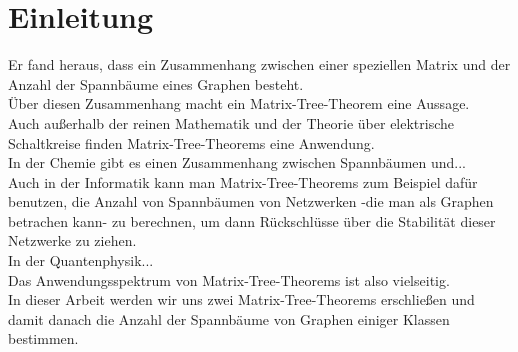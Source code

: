 \graphicspath{{grafiken/}}

\section{Einleitung}



Er fand heraus, dass ein Zusammenhang zwischen einer speziellen Matrix und der Anzahl der Spannbäume eines Graphen besteht. \\
Über diesen Zusammenhang macht ein Matrix-Tree-Theorem eine Aussage.\\
Auch außerhalb der reinen Mathematik und der Theorie über elektrische Schaltkreise finden Matrix-Tree-Theorems eine Anwendung.\\
In der Chemie gibt es einen Zusammenhang zwischen Spannbäumen und...\\
Auch in der Informatik kann man Matrix-Tree-Theorems zum Beispiel dafür benutzen, die Anzahl von Spannbäumen von Netzwerken -die man als Graphen betrachen kann- zu berechnen, um dann Rückschlüsse über die Stabilität dieser Netzwerke zu ziehen.\\
In der Quantenphysik...\\
Das Anwendungsspektrum von Matrix-Tree-Theorems ist also vielseitig.\\
In dieser Arbeit werden wir uns zwei Matrix-Tree-Theorems erschließen und damit danach die Anzahl der Spannbäume von Graphen einiger Klassen bestimmen.
